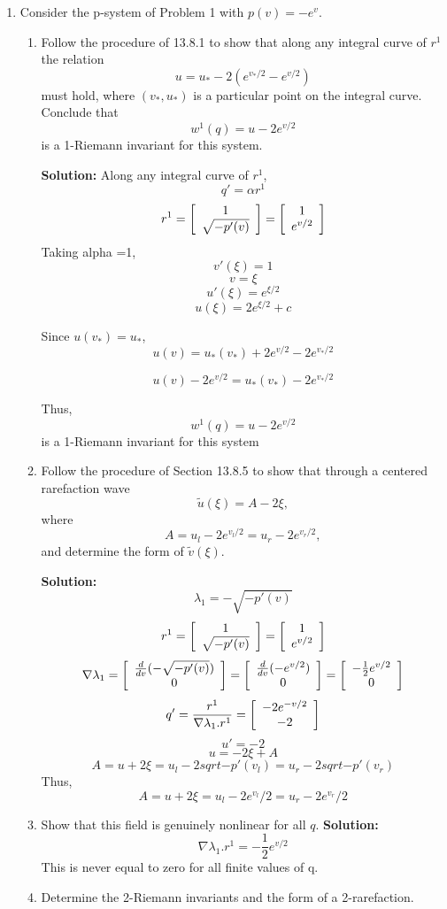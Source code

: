 \documentclass[11pt]{article}
\newenvironment{mat}{\left[ \begin{array}{ccccccccccccc}}{\end{array}\right]}
\newcommand\bcm{\begin{mat}}
\newcommand\ecm{\end{mat}}
\begin{document}
\begin{enumerate}

\vskip 1cm
\hrule
\item

Consider the p-system of Problem 1 with $p(v) = -e^v$.

\begin{enumerate}
\item Follow the procedure of 13.8.1 to show that along any
integral curve of $r^1$ the relation 
\[
u = u_* - 2\left( e^{v_*/2} - e^{v/2}\right)
\]
must hold, where $(v_*,u_*)$ is a particular point on the integral curve.
Conclude that 
\[
w^1(q) = u - 2e^{v/2}
\]
is a 1-Riemann invariant for this system.

\vskip 1cm
{\bf Solution:}
 Along any integral curve of $r^1$,
 \[q' = \alpha r^1\]
 \[r^1 = \bcm 1\\  \sqrt{-p'(v)}\ecm= \bcm 1\\  e^{v/2}\ecm \]
 Taking alpha =1,
 \[v'(\xi)= 1\]
 \[v= \xi\]
 \[u'(\xi)=e^{\xi/2}\]
  \[u(\xi)=2e^{\xi/2}+c\]
  
 Since $u(v_*)=u_*$,
  \[u(v)=u_*(v_*)+ 2e^{v/2}-2e^{v_*/2} \]
  
    \[u(v)- 2e^{v/2}=u_*(v_*)-2e^{v_*/2} \]
 
Thus,
\[
w^1(q) = u - 2e^{v/2}
\]
is a 1-Riemann invariant for this system
\item Follow the procedure of Section 13.8.5 to show that through a centered
rarefaction wave 
\[
\tilde u(\xi) = A - 2\xi,
\]
where 
\[
A = u_l - 2 e^{v_l/2} = u_r - 2e^{v_r/2},
\]
and determine the form of $\tilde v(\xi)$.

\vskip 1cm
{\bf Solution:}
\[\lambda_1=- \sqrt{-p'(v)}\]
 \[r^1 = \bcm 1\\  \sqrt{-p'(v)}\ecm= \bcm 1\\  e^{v/2}\ecm\]
\[\nabla \lambda_1 = \bcm \frac{d}{dv} (- \sqrt{-p'(v)})\\0 \ecm  = \bcm \frac{d}{dv} (- e^{v/2})\\0 \ecm = \bcm  -\frac{1}{2} e^{v/2}\\0 \ecm\] 
\[ q' = \frac{r^1}{\nabla \lambda_1 .r^1}= \bcm  -2 e^{-v/2}\\-2 \ecm\]
\[ u' = -2 \]
\[ u = -2 \xi +A \]
\[A= u + 2\xi = u_l - 2 sqrt{- p'(v_l)} =u_r - 2 sqrt{- p'(v_r)} \]
Thus,
\[A= u + 2\xi = u_l - 2 e^{{v_l}}/2 =u_r - 2 e^{{v_r}}/2 \]
\item Show that this field is genuinely nonlinear for all $q$.
\vskip 1cm
{\bf Solution:}
 \[\nabla \lambda_1 . r^1 = -\frac{1}{2} e^{v/2} \]
  This is never equal to zero for all finite values of q. 
\item Determine the 2-Riemann invariants and the form of a 2-rarefaction.


\end{enumerate}
\end{enumerate}
\end{document}
